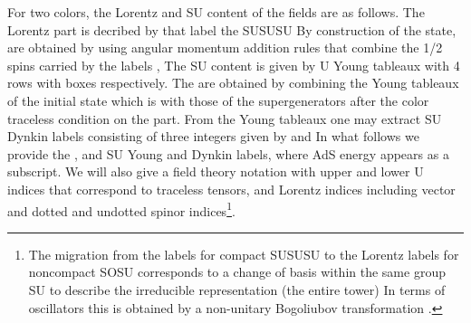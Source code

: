 \documentclass[a4paper,aps,preprint,nofootinbib]{revtex4}
\begin{document}
For two colors, \coordHE{} the Lorentz and SU\myHighlight{$\left( 4\right) $}\coordHE{} content of the
fields are as follows. The Lorentz part is decribed by \myHighlight{$\left[ j_{1},j_{2}%
\right] $}\coordHE{} that label the SU\myHighlight{$\left( 2\right) \times$}\coordHE{}SU\myHighlight{$\left( 2\right)
\subset $}\coordHE{}SU\coordHE{} By construction of the state, \myHighlight{$\left[
j_{1},j_{2}\right] $}\coordHE{} are obtained by using angular momentum addition rules
that combine the 1/2 spins carried by the labels \coordHE{},\coordHE{} The SU\myHighlight{$%
\left( 4\right) $}\coordHE{} content is given by U\myHighlight{$\left( 4\right) $}\coordHE{} Young tableaux
with 4 rows with \coordHE{} boxes
respectively. The \coordHE{} are obtained by combining the Young tableaux of
the initial state \coordHE{} which is \coordHE{}
with those of the supergenerators after the color traceless condition on the
\coordHE{} part. From the Young tableaux one may extract SU\myHighlight{$\left( 4\right) $}\coordHE{}
Dynkin labels consisting of three integers \coordHE{} given by \coordHE{}  \coordHE{} and \coordHE{} In what follows we provide
the \coordHE{}, and SU\myHighlight{$\left( 4\right) $}\coordHE{} Young and
Dynkin labels, where AdS energy \coordHE{} appears as a
subscript. We will also give a field theory notation with upper and lower U\myHighlight{$%
\left( 4\right) $}\coordHE{} indices that correspond to traceless tensors, and Lorentz
indices including vector and dotted and undotted spinor indices\footnote{%
The migration from the \coordHE{} labels for compact SU\myHighlight{$%
\left( 2\right) \times $}\coordHE{}SU\myHighlight{$\left( 2\right) \subset$}\coordHE{}SU\coordHE{} to
the Lorentz labels for noncompact SO\coordHE{}SU\coordHE{} corresponds to a change of basis within the same group SU\coordHE{} to describe the irreducible representation (the entire
tower)\coordHE{} In terms of oscillators this is obtained by a non-unitary
Bogoliubov transformation \cite{G}.}.
\end{document}
